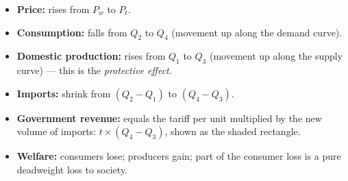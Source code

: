 \documentclass[11pt]{article}
\begin{document}
\begin{itemize}
\item \textbf{Price:} rises from $P_w$ to $P_t$.
\item \textbf{Consumption:} falls from $Q_2$ to $Q_4$ (movement up along the demand curve).
\item \textbf{Domestic production:} rises from $Q_1$ to $Q_3$ (movement up along the supply curve) --- this is the \emph{protective effect}.
\item \textbf{Imports:} shrink from $(Q_2 - Q_1)$ to $(Q_4 - Q_3)$.
\item \textbf{Government revenue:} equals the tariff per unit multiplied by the new volume of imports: $t \times (Q_4 - Q_3)$, shown as the shaded rectangle.
\item \textbf{Welfare:} consumers lose; producers gain; part of the consumer loss is a pure deadweight loss to society.
\end{itemize}
\end{document}
